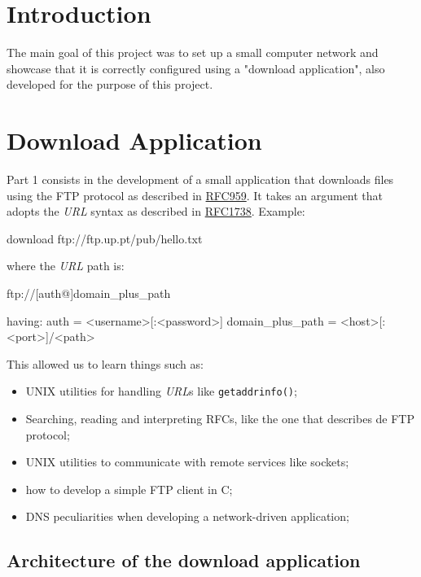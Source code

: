 
\section{Introduction}

The main goal of this project was to set up a small computer network and showcase that it is correctly configured using a "download application", also developed for the purpose of this project.

\section{Download Application}

Part 1 consists in the development of a small application that downloads files using the FTP protocol as described in \href{https://www.rfc-editor.org/rfc/rfc959}{RFC959}.
It takes an argument that adopts the \textit{URL} syntax as described in \href{https://www.rfc-editor.org/rfc/rfc1738}{RFC1738}. Example:

\begin{code-bash}
download ftp://ftp.up.pt/pub/hello.txt
\end{code-bash}

where the \textit{URL} path is:

\begin{code-bash}
ftp://[auth@]domain_plus_path

having:
auth = <username>[:<password>]
domain_plus_path = <host>[:<port>]/<path>
\end{code-bash}

This allowed us to learn things such as:
\begin{itemize}
    \item UNIX utilities for handling \textit{URL}s like \lstinline{getaddrinfo()};
    \item Searching, reading and interpreting RFCs, like the one that describes de FTP protocol;
    \item UNIX utilities to communicate with remote services like sockets;
    \item how to develop a simple FTP client in C;
    \item DNS peculiarities when developing a network-driven application;
\end{itemize}

\subsection{Architecture of the download application}

